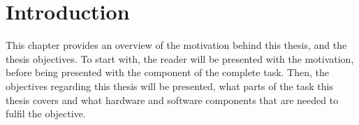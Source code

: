 \chapter{Introduction}
This chapter provides an overview of the motivation behind this thesis, and the thesis objectives. To start with, the reader will be presented with the motivation, before being presented with the component of the complete task. Then, the objectives regarding this thesis will be presented, what parts of the task this thesis covers and what hardware and software components that are needed to fulfil the objective.




